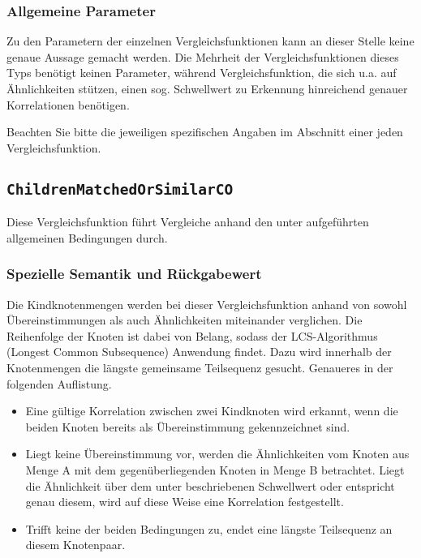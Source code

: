 \subsubsection*{Allgemeine Parameter}
Zu den Parametern der einzelnen Vergleichsfunktionen kann an dieser Stelle keine genaue Aussage gemacht werden. Die Mehrheit der Vergleichsfunktionen dieses Typs benötigt keinen Parameter, während Vergleichsfunktion, die sich u.a. auf Ähnlichkeiten stützen, einen sog. Schwellwert zu Erkennung hinreichend genauer Korrelationen benötigen.

Beachten Sie bitte die jeweiligen spezifischen Angaben im Abschnitt  einer jeden Vergleichsfunktion.



\newpage
%
%
\subsection{\texttt{ChildrenMatchedOrSimilarCO}}
Diese Vergleichsfunktion führt Vergleiche anhand den unter  aufgeführten allgemeinen Bedingungen durch.

\subsubsection*{Spezielle Semantik und Rückgabewert}
Die Kindknotenmengen werden bei dieser Vergleichsfunktion anhand von sowohl Übereinstimmungen als auch Ähnlichkeiten miteinander verglichen. Die Reihenfolge der Knoten ist dabei von Belang, sodass der LCS-Algorithmus (Longest Common Subsequence) Anwendung findet. Dazu wird innerhalb der Knotenmengen die längste gemeinsame Teilsequenz gesucht. Genaueres in der folgenden Auflistung.
\begin{itemize}
	\item Eine gültige Korrelation zwischen zwei Kindknoten wird erkannt, wenn die beiden Knoten bereits als Übereinstimmung gekennzeichnet sind.
	\item Liegt keine Übereinstimmung vor, werden die Ähnlichkeiten vom Knoten aus Menge A mit dem gegenüberliegenden Knoten in Menge B betrachtet. Liegt die Ähnlichkeit über dem unter  beschriebenen Schwellwert oder entspricht genau diesem, wird auf diese Weise eine Korrelation festgestellt.
	\item Trifft keine der beiden Bedingungen zu, endet eine längste Teilsequenz an diesem Knotenpaar.
\end{itemize}

